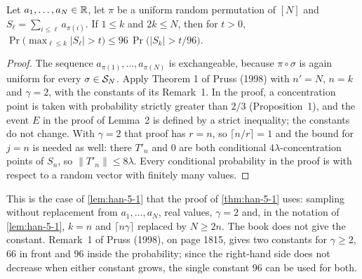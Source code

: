 \begin{lemma}
  \label{lem:pruss-sampling}
  Let $a_1,\dots,a_N\in\mathbb{R}$, let $\pi$ be a uniform random permutation of $[N]$ and $S_\ell=\sum_{i\le\ell}a_{\pi(i)}$. If $1\le k$ and $2k\le N$, then for $t>0$,
  $\Pr\bigl(\max_{\ell\le k}|S_\ell|>t\bigr)\le 96\,\Pr\bigl(|S_k|>t/96\bigr)$.
\end{lemma}
\begin{proof}
  The sequence $a_{\pi(1)},\dots,a_{\pi(N)}$ is exchangeable, because $\pi\circ\sigma$ is again uniform for every $\sigma\in\mathcal{S}_N$. Apply Theorem 1 of Pruss (1998) with $n'=N$, $n=k$ and $\gamma=2$, with the constants of its Remark~1. In the proof, a concentration point is taken with probability strictly greater than $2/3$ (Proposition~1), and the event $E$ in the proof of Lemma~2 is defined by a strict inequality; the constants do not change. With $\gamma=2$ that proof has $r=n$, so $\lceil n/r\rceil=1$ and the bound for $j=n$ is needed as well: there $T'_n$ and $0$ are both conditional $4\lambda$-concentration points of $S_n$, so $\|T'_n\|\le8\lambda$. Every conditional probability in the proof is with respect to a random vector with finitely many values.
\end{proof}
\begin{remark}
  This is the case of \cref{lem:han-5-1} that the proof of \cref{thm:han-5-1} uses: sampling without replacement from $a_1,\dots,a_N$, real values, $\gamma=2$ and, in the notation of \cref{lem:han-5-1}, $k=n$ and $\lceil n\gamma\rceil$ replaced by $N\ge2n$. The book does not give the constant. Remark~1 of Pruss (1998), on page 1815, gives two constants for $\gamma\ge2$, $66$ in front and $96$ inside the probability; since the right-hand side does not decrease when either constant grows, the single constant $96$ can be used for both.
\end{remark}

